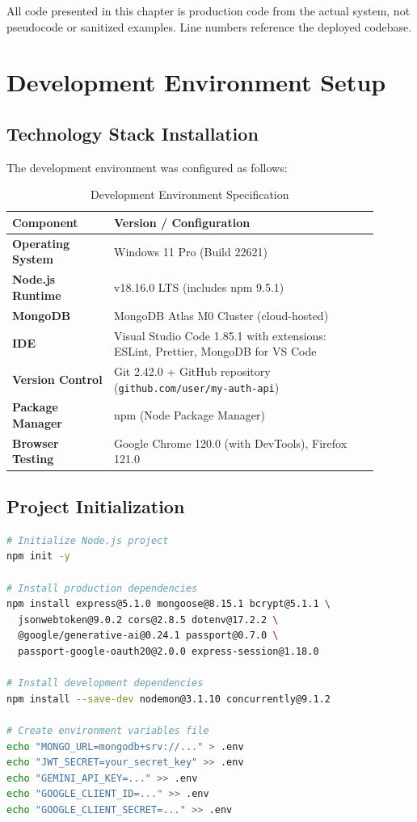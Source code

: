 All code presented in this chapter is production code from the actual system, not pseudocode or sanitized examples. Line numbers reference the deployed codebase.

\section{Development Environment Setup}

\subsection{Technology Stack Installation}

The development environment was configured as follows:

\begin{table}[H]
\centering
\caption{Development Environment Specification}
\label{tab:dev_env}
\begin{tabular}{@{}p{0.25\linewidth}p{0.65\linewidth}@{}}
\toprule
\textbf{Component} & \textbf{Version / Configuration} \\
\midrule
\textbf{Operating System} & Windows 11 Pro (Build 22621) \\
\textbf{Node.js Runtime} & v18.16.0 LTS (includes npm 9.5.1) \\
\textbf{MongoDB} & MongoDB Atlas M0 Cluster (cloud-hosted) \\
\textbf{IDE} & Visual Studio Code 1.85.1 with extensions: ESLint, Prettier, MongoDB for VS Code \\
\textbf{Version Control} & Git 2.42.0 + GitHub repository (\texttt{github.com/user/my-auth-api}) \\
\textbf{Package Manager} & npm (Node Package Manager) \\
\textbf{Browser Testing} & Google Chrome 120.0 (with DevTools), Firefox 121.0 \\
\bottomrule
\end{tabular}
\end{table}

\subsection{Project Initialization}

\begin{lstlisting}[language=bash, caption=Project Setup Commands]
# Initialize Node.js project
npm init -y

# Install production dependencies
npm install express@5.1.0 mongoose@8.15.1 bcrypt@5.1.1 \
  jsonwebtoken@9.0.2 cors@2.8.5 dotenv@17.2.2 \
  @google/generative-ai@0.24.1 passport@0.7.0 \
  passport-google-oauth20@2.0.0 express-session@1.18.0

# Install development dependencies
npm install --save-dev nodemon@3.1.10 concurrently@9.1.2

# Create environment variables file
echo "MONGO_URL=mongodb+srv://..." > .env
echo "JWT_SECRET=your_secret_key" >> .env
echo "GEMINI_API_KEY=..." >> .env
echo "GOOGLE_CLIENT_ID=..." >> .env
echo "GOOGLE_CLIENT_SECRET=..." >> .env
\end{lstlisting}

